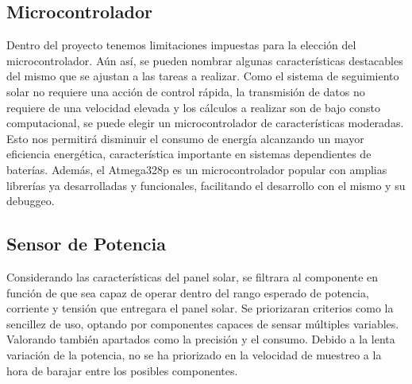 \documentclass[a4paper,12pt]{article}
\begin{document}
\subsection{Microcontrolador}
Dentro del proyecto tenemos limitaciones impuestas para la elección del microcontrolador. Aún así, se pueden nombrar algunas características destacables del mismo que se ajustan a las tareas a realizar. Como el sistema de seguimiento solar no requiere una acción de control rápida, la transmisión de datos no requiere de una velocidad elevada y los cálculos a realizar son de bajo consto computacional, se puede elegir un microcontrolador de características moderadas. Esto nos permitirá disminuir el consumo de energía alcanzando un mayor eficiencia energética, característica importante en sistemas  dependientes de baterías. Además, el Atmega328p es un microcontrolador popular con amplias librerías ya desarrolladas y funcionales, facilitando el desarrollo con el mismo y su debuggeo.\\

\subsection{Sensor de Potencia}
Considerando las características del panel solar, se filtrara al componente en función de que sea capaz de operar dentro del rango esperado de potencia, corriente y tensión que entregara el panel solar. Se priorizaran criterios como la sencillez de uso, optando por componentes capaces de sensar múltiples variables. Valorando también apartados como la precisión y el consumo.
Debido a la lenta variación de la potencia, no se ha priorizado en la velocidad de muestreo a la hora de barajar entre los posibles componentes.\\ 

\end{document}
